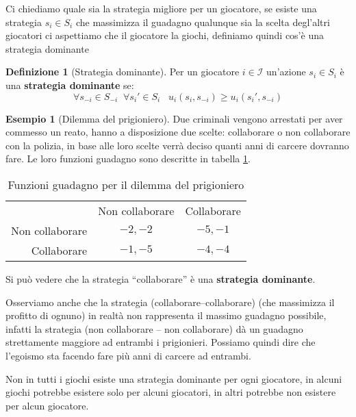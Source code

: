 \documentclass[a4paper]{article}
\newcounter{counter1}
\theoremstyle{plain}
\theoremstyle{definition}
\newtheorem{mydef}[counter1]{Definizione}
\newtheorem{myes}[counter1]{Esempio}
\theoremstyle{remark}
\newcommand{\pa}[1]{\left(#1\right)}
\begin{document}
Ci chiediamo quale sia la strategia migliore per un giocatore, se
esiste una strategia $s_i\in S_i$ che massimizza il guadagno qualunque
sia la scelta degl'altri giocatori ci aspettiamo che il giocatore la
giochi, definiamo quindi cos'è una strategia dominante

\begin{mydef}[Strategia dominante]
  Per un giocatore $i\in\mathcal{I}$ un'azione $s_i\in S_i$ è una
  \textbf{strategia dominante} se:
  \[ \forall s_{-i} \in S_{-i}\;\; \forall s_i' \in S_i\;\;\;
    u_i\pa{s_i,s_{-i}} \ge u_i\pa{s_i',s_{-i}} \]
\end{mydef}

\begin{myes}[Dilemma del prigioniero]
  Due criminali vengono arrestati per aver commesso un reato, hanno a
  disposizione due scelte: collaborare o non collaborare con la
  polizia, in base alle loro scelte verrà deciso quanti anni di
  carcere dovranno fare. Le loro funzioni guadagno sono descritte in
  tabella \ref{tab:u1u2-prigioniero}.
  
  \begin{table}[!ht]
    \centering
    \begin{tabular}{rcc}
      & Non collaborare & Collaborare \\
      \cline{2-3}
      Non collaborare & \multicolumn{1}{|c|}{$-2,-2$} & \multicolumn{1}{|c|}{$-5,-1$}  \\
      \cline{2-3}
      Collaborare & \multicolumn{1}{|c|}{$-1,-5$} & \multicolumn{1}{|c|}{$-4,-4$}  \\
      \cline{2-3}
    \end{tabular}
    \caption{Funzioni guadagno per il dilemma del prigioniero}
    \label{tab:u1u2-prigioniero}
  \end{table}
  
  Si può vedere che la strategia ``collaborare'' è una
  \textbf{strategia dominante}.

  Osserviamo anche che la strategia (collaborare--collaborare) (che
  massimizza il profitto di ognuno) in realtà non rappresenta il
  massimo guadagno possibile, infatti la strategia (non collaborare --
  non collaborare) dà un guadagno strettamente maggiore ad entrambi i
  prigionieri. Possiamo quindi dire che l'egoismo sta facendo fare più
  anni di carcere ad entrambi.
\end{myes}

Non in tutti i giochi esiste una strategia dominante per ogni
giocatore, in alcuni giochi potrebbe esistere solo per alcuni
giocatori, in altri potrebbe non esistere per alcun giocatore.
\end{document}
